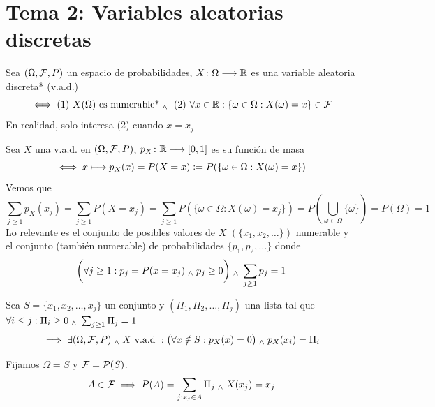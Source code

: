 \vspace{-1.5cm}
\section{Tema 2: Variables aleatorias discretas}
\begin{defn}
	Sea $(\Omega, \mathcal{F}, P)$ un espacio de probabilidades, $X \colon \Omega \longrightarrow \mathbb{R}$ es una variable aleatoria discreta* (v.a.d.)
	\[\iff \text{(1) } X(\Omega) \text{ es numerable*} \; _{\wedge} \; \text{ (2) }\forall x \in \mathbb{R} : \{\omega \in \Omega : X(\omega)=x\} \in \mathcal{F}\]
	En realidad, solo interesa (2) cuando $x=x_j$
\end{defn}
\begin{defn}
	Sea $X$ una v.a.d. en $(\Omega, \mathcal{F}, P)$, $p_X \colon \mathbb{R} \longrightarrow \left[0,1\right]$ es su función de masa
	\[\iff x\longmapsto p_X(x)=P(X=x)\vcentcolon= P(\{\omega \in \Omega : X(\omega)=x\})\]
	Vemos que
	\[\sum_{j\geq1}p_X(x_j)=\sum_{j\geq1}P(X=x_j)=\sum_{j\geq1} P(\{\omega \in \Omega : X(\omega)=x_j\})=P\left(\bigcup_{\omega\in\Omega}\{\omega\}\right)=P(\Omega)=1\]
	Lo relevante es el conjunto de posibles valores de $X$ $(\{x_1, x_2, \dots\})$
	numerable y el conjunto (también numerable) de probabilidades $\{p_1, p_2,
		\dots\}$ donde
	\[\bigg(\forall j \geq 1 : p_j=P(x=x_j) \; _{\wedge} \; p_j\geq 0 \bigg) \; _{\wedge} \; \sum_{j\geq 1}p_j=1\]
\end{defn}
\begin{teo}
	Sea $S=\{x_1, x_2, \dots, x_j\}$ un conjunto y $(\Pi_1, \Pi_2, \dots, \Pi_j)$ una lista tal que \\
	$\forall i \leq j : \Pi_i \geq 0 \; _{\wedge} \; \sum_{j\geq 1}\Pi_j=1$
	\[\implies \exists (\Omega, \mathcal{F}, P) \; _{\wedge} \; X\text{ v.a.d }:\big(\forall  x\notin S :p_X(x)= 0 \big) \; _{\wedge} \; p_X(x_i)=\Pi_i\]
	\begin{dem}
		Fijamos $\Omega = S$ y $\mathcal{F}=\mathcal{P}(S)$.
		\[A\in \mathcal{F} \implies P(A)=\sum_{j:x_j\in A}\Pi_j \; _{\wedge} \; X(x_j)=x_j\]
	\end{dem}
\end{teo}

